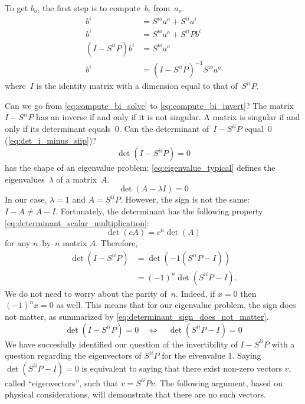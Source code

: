 To get $b_o$, the first step is to compute~$b_i$ from~$a_o$.
\begin{subequations}
    \begin{align}
        b^i &= S^{io}a^o + S^{ii}a^i \label{eq:compute_bi_ai} \\
        b^i &= S^{io}a^o + S^{ii}Pb^i \label{eq:compute_bi_bi} \\
        (I - S^{ii}P)b^i &= S^{io}a^o \label{eq:compute_bi_solve} \\
        b^i &= (I - S^{ii}P)^{-1} S^{io}a^o \label{eq:compute_bi_invert}
    \end{align} \label{eq:compute_bi}
\end{subequations}
where~$I$ is the identity matrix with a dimension equal to that of~$S^{ii}P$.

Can we go from \cref{eq:compute_bi_solve} to \cref{eq:compute_bi_invert}?
The matrix~$I - S^{ii}P$ has an inverse if and only if it is not singular.
A matrix is singular if and only if its determinant equals~0.
Can the determinant of~$I - S^{ii}P$ equal~0 (\cref{eq:det_i_minus_siip})?
\begin{equation}
    \det(I - S^{ii}P) = 0 \label{eq:det_i_minus_siip}
\end{equation}
 has the shape of an eigenvalue problem;
\cref{eq:eigenvalue_typical} defines the eigenvalues~$\lambda$ of a matrix~$A$.
\begin{equation}
    \det(A - \lambda I) = 0 \label{eq:eigenvalue_typical}
\end{equation}
In our case, $\lambda=1$ and $A=S^{ii}P$.
However, the sign is not the same: $I-A \neq A-I$.
Fortunately, the determinant has the following property \cref{eq:determinant_scalar_multiplication}:
\begin{equation}
    \det(c A) = c^n \det(A) \label{eq:determinant_scalar_multiplication}
\end{equation}
for any $n$--by--$n$ matrix $A$.
Therefore,
\begin{subequations}
    \begin{align}
        \det(I - S^{ii}P)
        &= \det(-1(S^{ii}P - I)) \\
        &= (-1)^n \det(S^{ii}P - I) \text{.}
    \end{align}
\end{subequations}
We do not need to worry about the parity of~$n$.
Indeed, if $x=0$ then $(-1)^n x = 0$ as well.
This means that for our eigenvalue problem, the sign does not matter, as summarized by \cref{eq:determinant_sign_does_not_matter}.
\begin{equation}
    \det(I - S^{ii}P) = 0
    \quad
    \Longleftrightarrow
    \quad
    \det(S^{ii}P - I) = 0
    \label{eq:determinant_sign_does_not_matter}
\end{equation}
We have succesfully identified our question of the invertibility of $I - S^{ii}P$ with a question regarding the eigenvectors of $S^{ii}P$ for the eivenvalue 1.
Saying $\det(S^{ii}P - I) = 0$ is equivalent to saying that there exist non-zero vectors $v$, called ``eigenvectors'', such that $v = S^{ii}Pv$.
The following argument, based on physical considerations, will demonstrate that there are no such vectors.

